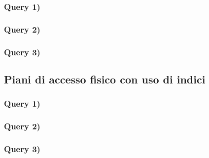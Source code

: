 \documentclass[a4paper,12pt]{article}
\begin{document}
 \subsubsection{ Query 1) }

 \subsubsection{ Query 2) }

 \subsubsection{ Query 3) }

 \subsection{ Piani di accesso fisico con uso di indici }

 \subsubsection{ Query 1) }

 \subsubsection{ Query 2) }

 \subsubsection{ Query 3) }
\end{document}
